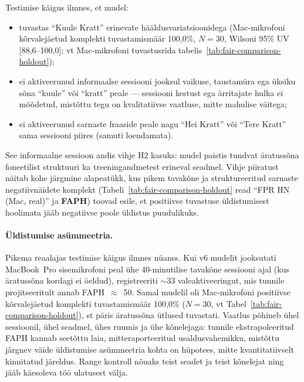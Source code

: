 Testimise käigus ilmnes, et mudel:
\begin{itemize}
    \item tuvastas \enquote{Kuule Kratt} erinevate hääldusvariatsioonidega (Mac-mikrofoni kõrvalejäetud komplekti tuvastamismäär 100,0\%, $N=30$, Wilsoni 95\% UV [88,6--100,0]; vt Mac-mikrofoni tuvastusrida tabelis~\ref{tab:fair-comparison-holdout});
    \item ei aktiveerunud informaalse sessiooni jooksul vaikuse, taustamüra ega üksiku sõna \enquote{kuule} või \enquote{kratt} peale --- sessiooni kestust ega ärritajate hulka ei mõõdetud, mistõttu tegu on kvalitatiivse vaatluse, mitte mahulise väitega;
    \item ei aktiveerunud sarnaste fraaside peale nagu \enquote{Hei Kratt} või \enquote{Tere Kratt} sama sessiooni piires (samuti loendamata).
\end{itemize}

See informaalne sessioon andis vihje H2 kasuks: mudel paistis tundvat äratussõna foneetilist struktuuri ka treeningandmetest erineval seadmel. Vihje piiratust näitab kohe järgmine alapeatükk, kus pikem tavakõne ja struktureeritud sarnaste negatiivnäidete komplekt (Tabeli~\ref{tab:fair-comparison-holdout} read \enquote{FPR HN (Mac, real)} ja \textbf{FAPH}) toovad esile, et positiivse tuvastuse üldistumisest hoolimata jääb negatiivse poole üldistus puudulikuks.

\paragraph{Üldistumise asümmeetria.}
\label{sec:cross-mic-asymmetry}

Pikema reaalajas testimise käigus ilmnes nüanss. Kui v6 mudelit jooksutati MacBook~Pro sisemikrofoni peal ühe 40-minutilise tavakõne sessiooni ajal (kus äratussõna kordagi ei öeldud), registreeriti $\sim$33 valeaktiveeringut, mis tunnile projitseeritult annab FAPH~$\approx$~50. Samal mudelil oli Mac-mikrofoni positiivse kõrvalejäetud komplekti tuvastamismäär 100,0\% ($N=30$, vt Tabel~\ref{tab:fair-comparison-holdout}), st päris äratussõna ütlused tuvastati. Vaatlus põhineb ühel sessioonil, ühel seadmel, ühes ruumis ja ühe kõnelejaga: tunnile ekstrapoleeritud FAPH kannab seetõttu laia, mitteraporteeritud usaldusvahemikku, mistõttu järgnev väide üldistumise asümmeetria kohta on hüpotees, mitte kvantitatiivselt kinnitatud järeldus. Range kontroll nõuaks teist seadet ja teist kõnelejat ning jääb käesoleva töö ulatusest välja.

